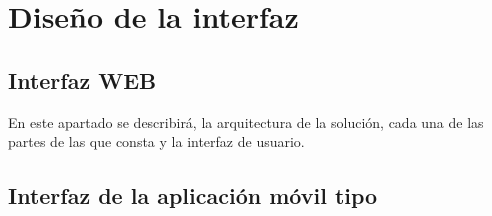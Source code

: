 \chapter{Diseño de la interfaz}

\section{Interfaz WEB}
En este apartado se describirá, la arquitectura de la solución, cada una de las partes de las que consta y la interfaz de usuario.


\section{Interfaz de la aplicación móvil tipo}